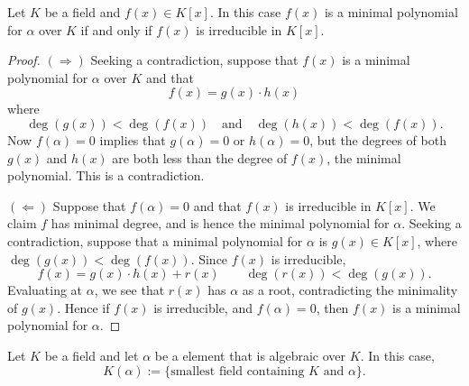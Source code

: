 \documentclass{ximera}
\begin{document}
\begin{lemma}\label{L:ipi}
  Let $K$ be a field and $f(x)\in K[x]$. In this case $f(x)$ is a
  minimal polynomial for $\alpha$ over $K$ if and only if $f(x)$ is
  irreducible in $K[x]$.
  \begin{proof}
    $(\Rightarrow)$ Seeking a contradiction, suppose that $f(x)$ is a
    minimal polynomial for $\alpha$ over $K$ and that
    \[
    f(x) = g(x) \cdot h(x) 
    \]
    where
    \[
    \deg(g(x)) <\deg(f(x))\quad\text{and}\quad\deg(h(x)) <\deg(f(x)).
    \]
    Now $f(\alpha) = 0$ implies that $g(\alpha) =0$ or $h(\alpha) =
    0$, but the degrees of both $g(x)$ and $h(x)$ are both less than
    the degree of $f(x)$, the minimal polynomial. This is a
    contradiction.

    $(\Leftarrow)$ Suppose that $f(\alpha) = 0$ and that $f(x)$ is
    irreducible in $K[x]$. We claim $f$ has minimal degree, and is
    hence the minimal polynomial for $\alpha$. Seeking a
    contradiction, suppose that a minimal polynomial for $\alpha$ is
    $g(x)\in K[x]$, where $\deg(g(x)) < \deg(f(x))$. Since $f(x)$ is irreducible,
    \[
    f(x) = g(x) \cdot h(x) + r(x) \qquad \deg(r(x))<\deg(g(x)).
    \]
    Evaluating at $\alpha$, we see that $r(x)$ has $\alpha$ as a root,
    contradicting the minimality of $g(x)$. Hence if $f(x)$ is
    irreducible, and $f(\alpha) = 0$, then $f(x)$ is a minimal
    polynomial for $\alpha$.
  \end{proof}
\end{lemma}

\begin{definition}
  Let $K$ be a field and let $\alpha$ be a element that is algebraic
  over $K$. In this case,
  \[
  K(\alpha) := \{\text{smallest field containing $K$ and $\alpha$}\}.
  \]
\end{definition}
\end{document}
